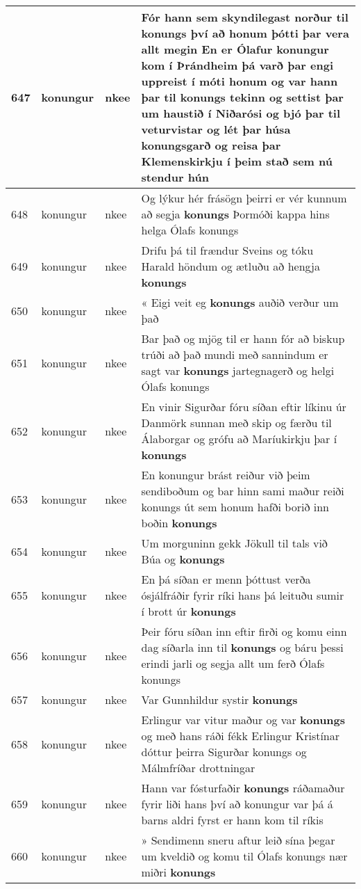 \documentclass{article}
\begin{document}
\begin{longtable}{p{1cm}|p{1cm}|p{1cm}|p{13cm}}
\hline
647&konungur&nkee&Fór hann sem skyndilegast norður til \textbf{konungs} því að honum þótti þar vera allt megin En er Ólafur konungur kom í Þrándheim þá varð þar engi uppreist í móti honum og var hann þar til konungs tekinn og settist þar um haustið í Niðarósi og bjó þar til veturvistar og lét þar húsa konungsgarð og reisa þar Klemenskirkju í þeim stað sem nú stendur hún\\
\hline
648&konungur&nkee&Og lýkur hér frásögn þeirri er vér kunnum að segja \textbf{konungs} Þormóði kappa hins helga Ólafs konungs\\
\hline
649&konungur&nkee&Drifu þá til frændur Sveins og tóku Harald höndum og ætluðu að hengja \textbf{konungs} \\
\hline
650&konungur&nkee&« Eigi veit eg \textbf{konungs} auðið verður um það\\
\hline
651&konungur&nkee&Bar það og mjög til er hann fór að biskup trúði að það mundi með sannindum er sagt var \textbf{konungs} jartegnagerð og helgi Ólafs konungs\\
\hline
652&konungur&nkee&En vinir Sigurðar fóru síðan eftir líkinu úr Danmörk sunnan með skip og færðu til Álaborgar og grófu að Maríukirkju þar í \textbf{konungs} \\
\hline
653&konungur&nkee&En konungur brást reiður við þeim sendiboðum og bar hinn sami maður reiði konungs út sem honum hafði borið inn boðin \textbf{konungs} \\
\hline
654&konungur&nkee&Um morguninn gekk Jökull til tals við Búa og \textbf{konungs} \\
\hline
655&konungur&nkee&En þá síðan er menn þóttust verða ósjálfráðir fyrir ríki hans þá leituðu sumir í brott úr \textbf{konungs} \\
\hline
656&konungur&nkee&Þeir fóru síðan inn eftir firði og komu einn dag síðarla inn til \textbf{konungs} og báru þessi erindi jarli og segja allt um ferð Ólafs konungs\\
\hline
657&konungur&nkee&Var Gunnhildur systir \textbf{konungs} \\
\hline
658&konungur&nkee&Erlingur var vitur maður og var \textbf{konungs} og með hans ráði fékk Erlingur Kristínar dóttur þeirra Sigurðar konungs og Málmfríðar drottningar\\
\hline
659&konungur&nkee&Hann var fósturfaðir \textbf{konungs} ráðamaður fyrir liði hans því að konungur var þá á barns aldri fyrst er hann kom til ríkis\\
\hline
660&konungur&nkee&» Sendimenn sneru aftur leið sína þegar um kveldið og komu til Ólafs konungs nær miðri \textbf{konungs} \\

\end{longtable}
\end{document}
